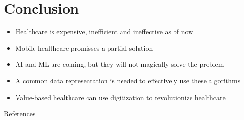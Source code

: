 \documentclass[xcolor=dvipsnames, aspectratio=1610]{beamer}
\begin{document}

\section{Conclusion}%
\label{sec:conclusion}

\begin{frame}{\secname}
    \begin{itemize}[<+->]
        \item Healthcare is expensive, inefficient and ineffective as of now
        \item Mobile healthcare promisses a partial solution
        \item AI and ML are coming, but they will not magically solve the problem
        \item A common data representation is needed to effectively use these algorithms
        \item Value-based healthcare can use digitization to revolutionize healthcare
    \end{itemize}
\end{frame}


\begin{frame}[allowframebreaks]{References}
    
    
\end{frame}
\end{document}
